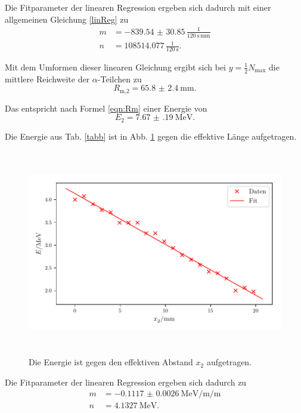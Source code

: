 \noindent Die Fitparameter der linearen Regression ergeben sich dadurch mit einer allgemeinen Gleichung \eqref{linReg} zu 
\begin{align*}
    m &= -\num{839.54(3085)}\, \frac{\text{1}}{\SI{120}{\second} \, \si{\milli\meter}} \\
    n &= \num{108514.077} \, \frac{\text{1}}{\SI{120}{\second}} .
\end{align*}


\noindent Mit dem Umformen dieser linearen Gleichung ergibt sich bei $y = \frac{1}{2} N_\text{max}$ die mittlere Reichweite der $\alpha$-Teilchen zu %
\begin{equation*}
    R_\text{m,2} = \SI{65.8(24)}{\milli\meter}.
\end{equation*}


\noindent Das entspricht nach Formel \eqref{eqn:Rm} einer Energie von %
\begin{equation*}
    E_2 = \SI{7.67(19)}{\mega\electronvolt}.
\end{equation*}

\noindent Die Energie aus Tab. \ref{tabb} ist in Abb. \ref{fig:energie2} gegen die effektive Länge aufgetragen.
\begin{figure}
    \centering
    \includegraphics[width=15cm, height=9cm]{build/plotd.pdf}
    \caption{Die Energie ist gegen den effektiven Abstand $x_2$ aufgetragen.}
    \label{fig:energie2}
\end{figure}

\noindent Die Fitparameter der linearen Regression ergeben sich dadurch zu 
\begin{align*}
    m &= -\SI{0.1117(26)}{\mega\electronvolt\per\milli\per\meter} \\
    n &= \SI{4.1327}{\mega\electronvolt}.
\end{align*}

